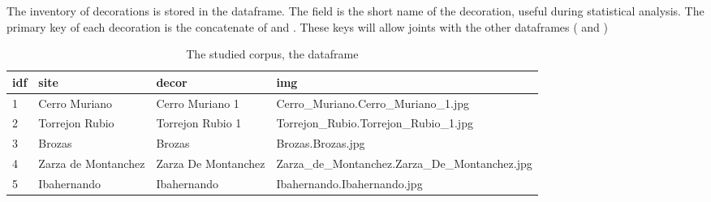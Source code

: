 \documentclass[article]{jss}\usepackage{knitr}
\begin{document}
The inventory of decorations is stored in the  dataframe. The field  is the short name of the decoration, useful during statistical analysis. The primary key of each decoration is the concatenate of  and . These keys will allow joints with the other dataframes ( and )\\
%
\begin{table}[H]
\centering
\begin{tabular}{|p{0.5cm}|p{2.5cm}|p{2.5cm}|p{8.5cm}|}
  \hline
idf & site & decor & img \\ 
  \hline
  1 & Cerro Muriano & Cerro Muriano 1 & Cerro\_Muriano.Cerro\_Muriano\_1.jpg \\ 
    2 & Torrejon Rubio & Torrejon Rubio 1 & Torrejon\_Rubio.Torrejon\_Rubio\_1.jpg \\ 
    3 & Brozas & Brozas & Brozas.Brozas.jpg \\ 
    4 & Zarza de Montanchez & Zarza De Montanchez & Zarza\_de\_Montanchez.Zarza\_De\_Montanchez.jpg \\ 
    5 & Ibahernando & Ibahernando & Ibahernando.Ibahernando.jpg \\ 
   \hline
\end{tabular}
\caption{The studied corpus, the  dataframe} 
\label{Test_table}
\end{table}
\end{document}
